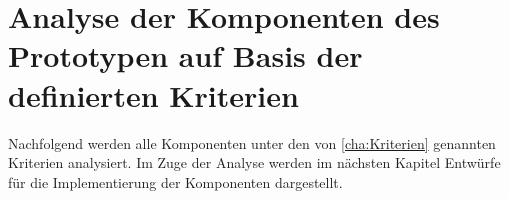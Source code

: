 \chapter{Analyse der Komponenten des Prototypen auf Basis der definierten Kriterien}
\label{cha:Analyse}
Nachfolgend werden alle Komponenten unter den von \ref{cha:Kriterien} genannten Kriterien analysiert. Im Zuge der Analyse werden im nächsten Kapitel Entwürfe für die Implementierung der Komponenten dargestellt.